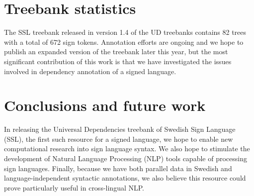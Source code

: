 \documentclass[11pt]{article}
\begin{document}
\section{Treebank statistics}

The SSL treebank released in version 1.4 of the UD treebanks
contains 82 trees with a total of 672 sign tokens.
Annotation efforts are ongoing and we hope to publish an expanded version
of the treebank later this year, but the most significant contribution of
this work is that we have investigated the issues involved in dependency
annotation of a signed language.


\section{Conclusions and future work}

In releasing the Universal Dependencies treebank of Swedish Sign Language
(SSL), the first such resource for a signed language,
we hope to enable new computational research into sign language syntax.
We also hope to stimulate the development of Natural
Language Processing (NLP) tools capable of processing sign languages.
Finally, because we have both parallel data in Swedish and language-independent
syntactic annotations, we also believe this resource could prove particularly
useful in cross-lingual NLP.


%



\end{document}
